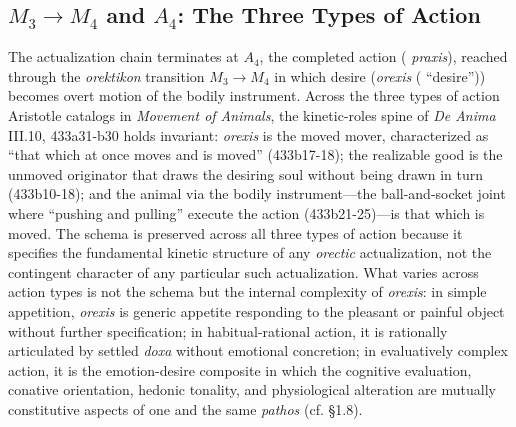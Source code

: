 \subsection{$M_3 \rightarrow M_4$ and $A_4$: The Three Types of Action}

The actualization chain terminates at $A_4$, the completed action ( \textit{praxis}), reached through the \textit{orektikon} transition $M_3 \rightarrow M_4$ in which desire (\textit{orexis} ( ``desire'')) becomes overt motion of the bodily instrument. Across the three types of action Aristotle catalogs in \textit{Movement of Animals}, the kinetic-roles spine of \textit{De Anima} III.10, 433a31-b30 holds invariant: \textit{orexis} is the moved mover, characterized as ``that which at once moves and is moved'' (433b17-18); the realizable good is the unmoved originator that draws the desiring soul without being drawn in turn (433b10-18); and the animal via the bodily instrument---the ball-and-socket joint where ``pushing and pulling'' execute the action (433b21-25)---is that which is moved. The schema is preserved across all three types of action because it specifies the fundamental kinetic structure of any \textit{orectic} actualization, not the contingent character of any particular such actualization. What varies across action types is not the schema but the internal complexity of \textit{orexis}: in simple appetition, \textit{orexis} is generic appetite responding to the pleasant or painful object without further specification; in habitual-rational action, it is rationally articulated by settled \textit{doxa} without emotional concretion; in evaluatively complex action, it is the emotion-desire composite in which the cognitive evaluation, conative orientation, hedonic tonality, and physiological alteration are mutually constitutive aspects of one and the same \textit{pathos} (cf. \S 1.8).

